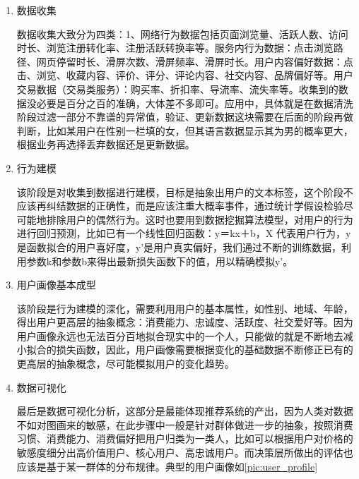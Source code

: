 	    \begin{enumerate}[(1)]
	    \item 数据收集

	    数据收集大致分为四类：1、网络行为数据包括页面浏览量、活跃人数、访问时长、浏览注册转化率、注册活跃转换率等。服务内行为数据：点击浏览路径、网页停留时长、滑屏次数、滑屏频率、滑屏时长。用户内容偏好数据：点击、浏览、收藏内容、评价、评分、评论内容、社交内容、品牌偏好等。用户交易数据（交易类服务）：购买率、折扣率、导流率、流失率等。收集到的数据没必要是百分之百的准确，大体差不多即可。应用中，具体就是在数据清洗阶段过滤一部分不靠谱的异常值，验证、更新数据这块需要在后面的阶段再做判断，比如某用户在性别一栏填的女，但其语言数据显示其为男的概率更大，根据业务再选择丢弃数据还是更新数据。
	    
	    \item 行为建模

	    该阶段是对收集到数据进行建模，目标是抽象出用户的文本标签，这个阶段不应该再纠结数据的正确性，而是应该注重大概率事件，通过统计学假设检验尽可能地排除用户的偶然行为。这时也要用到数据挖掘算法模型，对用户的行为进行回归预测，比如已有一个线性回归函数：y＝kx＋b，X 代表用户行为，y是函数拟合的用户喜好度，y'是用户真实偏好，我们通过不断的训练数据，利用参数k和参数b来得出最新损失函数下的值，用以精确模拟y'。

	    \item 用户画像基本成型

	    该阶段是行为建模的深化，需要利用用户的基本属性，如性别、地域、年龄，得出用户更高层的抽象概念：消费能力、忠诚度、活跃度、社交爱好等。因为用户画像永远也无法百分百地拟合现实中的一个人，只能做的就是不断地去减小拟合的损失函数，因此，用户画像需要根据变化的基础数据不断修正已有的更高层的抽象概念，尽可能模拟用户的变化趋势。

	    \item 数据可视化

	    最后是数据可视化分析，这部分是最能体现推荐系统的产出，因为人类对数据不如对图画来的敏感，在此步骤中一般是针对群体做进一步的抽象，按照消费习惯、消费能力、消费偏好把用户归类为一类人，比如可以根据用户对价格的敏感度细分出高价值用户、核心用户、高忠诚用户。而决策层所做出的评估也应该是基于某一群体的分布规律。典型的用户画像如\autoref{pic:user_profile}
	    \end{enumerate}
